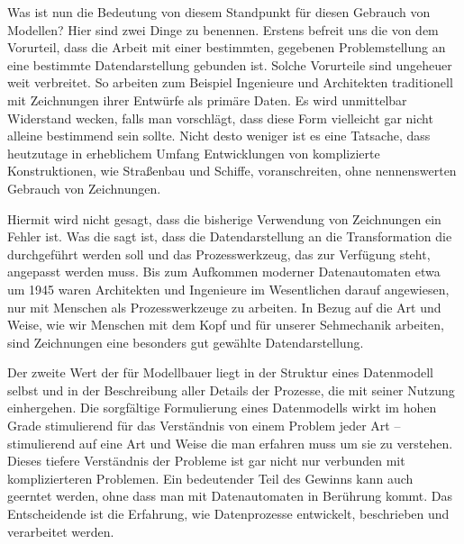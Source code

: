 {Was ist nun die Bedeutung von diesem  Standpunkt für diesen Gebrauch von Modellen? Hier sind zwei Dinge zu benennen. Erstens befreit uns die  von dem Vorurteil, dass die Arbeit mit einer bestimmten, gegebenen Problemstellung an eine bestimmte Datendarstellung gebunden ist. Solche Vorurteile sind ungeheuer weit verbreitet. So arbeiten zum Beispiel Ingenieure und Architekten traditionell mit Zeichnungen ihrer Entwürfe als primäre Daten. Es wird unmittelbar Widerstand wecken, falls man vorschlägt, dass diese Form vielleicht gar nicht alleine bestimmend sein sollte. Nicht desto weniger ist es eine Tatsache, dass heutzutage in erheblichem Umfang Entwicklungen von komplizierte Konstruktionen, wie Straßenbau und Schiffe, voranschreiten, ohne nennenswerten Gebrauch von Zeichnungen. 

Hiermit wird nicht gesagt, dass die bisherige Verwendung von Zeichnungen ein  Fehler ist. Was die  sagt ist, dass die Datendarstellung an die Transformation die durchgeführt werden soll und das Prozesswerkzeug, das zur Verfügung steht, angepasst werden muss. Bis zum Aufkommen moderner Datenautomaten etwa um 1945 waren Architekten und Ingenieure im Wesentlichen darauf angewiesen, nur mit Menschen als Prozesswerkzeuge zu arbeiten. In Bezug auf die Art und Weise, wie wir Menschen mit dem Kopf und für unserer Sehmechanik arbeiten, sind Zeichnungen eine besonders gut gewählte Datendarstellung. 

Der zweite Wert der  für Modellbauer liegt in der Struktur eines Datenmodell selbst und in der Beschreibung aller Details der Prozesse, die mit seiner Nutzung einhergehen. Die sorgfältige Formulierung eines Datenmodells wirkt im hohen Grade stimulierend für das Verständnis von einem Problem jeder Art -- stimulierend auf eine Art und Weise die man erfahren muss um sie zu verstehen. Dieses tiefere Verständnis der Probleme ist gar nicht nur verbunden mit komplizierteren Problemen. Ein bedeutender Teil des Gewinns kann auch geerntet werden, ohne dass man mit Datenautomaten in Berührung kommt. 
Das Entscheidende ist die Erfahrung, wie Datenprozesse entwickelt, beschrieben und verarbeitet werden.

}
